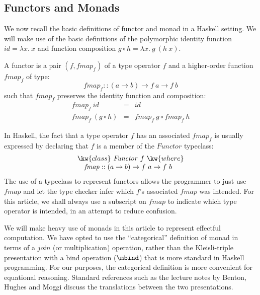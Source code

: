 \subsection{Functors and Monads}

We now recall the basic definitions of functor and monad in a Haskell
setting. We will make use of the basic definitions of the polymorphic
identity function $\mathit{id} = \lambda x.~x$ and function
composition $g \circ h = \lambda x.~g~(h~x)$.

\begin{definition}\label{defn:functor}
  A functor is a pair $(f, \mathit{fmap}_f)$ of a type operator $f$
  and a higher-order function $\mathit{fmap}_f$ of type:
  \begin{displaymath}
    \mathit{fmap}_f :: (a \to b) \to f~a \to f~b
  \end{displaymath}
  such that $\mathit{fmap}_f$ preserves the identity function and
  composition:
  \begin{eqnarray}
    \label{eq:fmap-id}
    \mathit{fmap}_f~\mathit{id} & = & \mathit{id} \\
    \label{eq:fmap-comp}
    \mathit{fmap}_f~(g \circ h) & = & \mathit{fmap}_f~g \circ \mathit{fmap}_f~h
  \end{eqnarray}
\end{definition}

In Haskell, the fact that a type operator $f$ has an associated
$\mathit{fmap}_f$ is usually expressed by declaring that $f$ is a
member of the $\mathit{Functor}$ typeclass:
\begin{displaymath}
  \begin{array}{l}
    \kw{class}~\mathit{Functor}~f~\kw{where} \\
    \quad \mathit{fmap} :: (a \to b) \to f~a \to f~b
  \end{array}
\end{displaymath}
The use of a typeclass to represent functors allows the programmer to
just use $\mathit{fmap}$ and let the type checker infer which $f$'s
associated $\mathit{fmap}$ was intended. For this article, we shall
always use a subscript on $\mathit{fmap}$ to indicate which type
operator is intended, in an attempt to reduce confusion.


We will make heavy use of monads in this article to represent
effectful computation. We have opted to use the ``categorical''
definition of monad in terms of a $\mathit{join}$ (or multiplication)
operation, rather than the Kleisli-triple presentation with a bind
operation ($\mbind$) that is more standard in Haskell programming. For
our purposes, the categorical definition is more convenient for
equational reasoning. Standard references such as the lecture notes by
Benton, Hughes and Moggi \cite{benton00monads} discuss the
translations between the two presentations.

